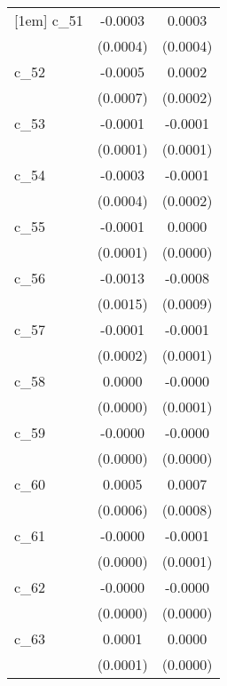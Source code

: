 {\begin{tabular}{l*{2}{c}}
[1em]
c\_51        &     -0.0003        &      0.0003        \\
            &    (0.0004)        &    (0.0004)        \\
[1em]
c\_52        &     -0.0005        &      0.0002        \\
            &    (0.0007)        &    (0.0002)        \\
[1em]
c\_53        &     -0.0001        &     -0.0001        \\
            &    (0.0001)        &    (0.0001)        \\
[1em]
c\_54        &     -0.0003        &     -0.0001        \\
            &    (0.0004)        &    (0.0002)        \\
[1em]
c\_55        &     -0.0001        &      0.0000        \\
            &    (0.0001)        &    (0.0000)        \\
[1em]
c\_56        &     -0.0013        &     -0.0008        \\
            &    (0.0015)        &    (0.0009)        \\
[1em]
c\_57        &     -0.0001        &     -0.0001        \\
            &    (0.0002)        &    (0.0001)        \\
[1em]
c\_58        &      0.0000        &     -0.0000        \\
            &    (0.0000)        &    (0.0001)        \\
[1em]
c\_59        &     -0.0000        &     -0.0000        \\
            &    (0.0000)        &    (0.0000)        \\
[1em]
c\_60        &      0.0005        &      0.0007        \\
            &    (0.0006)        &    (0.0008)        \\
[1em]
c\_61        &     -0.0000        &     -0.0001        \\
            &    (0.0000)        &    (0.0001)        \\
[1em]
c\_62        &     -0.0000        &     -0.0000        \\
            &    (0.0000)        &    (0.0000)        \\
[1em]
c\_63        &      0.0001        &      0.0000        \\
            &    (0.0001)        &    (0.0000)        \\

\end{tabular}}
